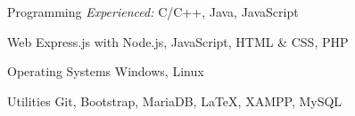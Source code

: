 

\begin{cvskills}

  \cvskill
    {Programming} %
    {\iffalse{\em Proficient:}\hspace{0.5em}\fi {\em Experienced:} C/C++, Java, JavaScript } %

  \cvskill
    {Web} %
    {Express.js with Node.js, JavaScript, HTML \& CSS, PHP } %

  \cvskill
    {Operating Systems} %
    {Windows, Linux} %

  \cvskill
    {Utilities} %
    {Git, Bootstrap, MariaDB, \LaTeX, XAMPP, MySQL} %
    
\end{cvskills}
